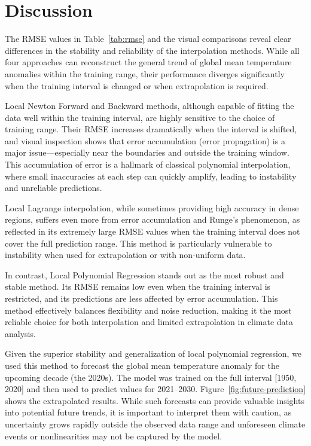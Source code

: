 \section{Discussion}

The RMSE values in Table~\ref{tab:rmse} and the visual comparisons reveal clear differences in the stability and reliability of the interpolation methods. While all four approaches can reconstruct the general trend of global mean temperature anomalies within the training range, their performance diverges significantly when the training interval is changed or when extrapolation is required.

Local Newton Forward and Backward methods, although capable of fitting the data well within the training interval, are highly sensitive to the choice of training range. Their RMSE increases dramatically when the interval is shifted, and visual inspection shows that error accumulation (error propagation) is a major issue—especially near the boundaries and outside the training window. This accumulation of error is a hallmark of classical polynomial interpolation, where small inaccuracies at each step can quickly amplify, leading to instability and unreliable predictions.

Local Lagrange interpolation, while sometimes providing high accuracy in dense regions, suffers even more from error accumulation and Runge's phenomenon, as reflected in its extremely large RMSE values when the training interval does not cover the full prediction range. This method is particularly vulnerable to instability when used for extrapolation or with non-uniform data.

In contrast, Local Polynomial Regression stands out as the most robust and stable method. Its RMSE remains low even when the training interval is restricted, and its predictions are less affected by error accumulation. This method effectively balances flexibility and noise reduction, making it the most reliable choice for both interpolation and limited extrapolation in climate data analysis.

Given the superior stability and generalization of local polynomial regression, we used this method to forecast the global mean temperature anomaly for the upcoming decade (the 2020s). The model was trained on the full interval [1950, 2020] and then used to predict values for 2021--2030. Figure~\ref{fig:future-prediction} shows the extrapolated results. While such forecasts can provide valuable insights into potential future trends, it is important to interpret them with caution, as uncertainty grows rapidly outside the observed data range and unforeseen climate events or nonlinearities may not be captured by the model.

